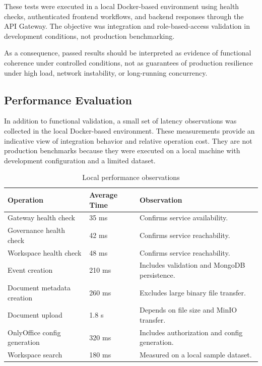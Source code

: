 These tests were executed in a local Docker-based environment using health
checks, authenticated frontend workflows, and backend responses through the API
Gateway. The objective was integration and role-based-access validation in
development conditions, not production benchmarking.

As a consequence, passed results should be interpreted as evidence of functional
coherence under controlled conditions, not as guarantees of production
resilience under high load, network instability, or long-running concurrency.

\subsection{Performance Evaluation}

In addition to functional validation, a small set of latency observations was
collected in the local Docker-based environment. These measurements provide an
indicative view of integration behavior and relative operation cost. They are
not production benchmarks because they were executed on a local machine with
development configuration and a limited dataset.

\begin{table}[!htbp]
\centering
\caption{Local performance observations}
\label{tab:local-performance-observations}
{
\scriptsize
\renewcommand{\arraystretch}{1.05}
\setlength{\tabcolsep}{3.4pt}
\begin{tabularx}{\textwidth}{|Y|C{1.8cm}|Y|}
\hline
\textbf{Operation} & \textbf{Average Time} & \textbf{Observation} \\
\hline
Gateway health check & 35 ms & Confirms service availability. \\
\hline
Governance health check & 42 ms & Confirms service reachability. \\
\hline
Workspace health check & 48 ms & Confirms service reachability. \\
\hline
Event creation & 210 ms & Includes validation and MongoDB persistence. \\
\hline
Document metadata creation & 260 ms & Excludes large binary file transfer. \\
\hline
Document upload & 1.8 s & Depends on file size and MinIO transfer. \\
\hline
OnlyOffice config generation & 320 ms & Includes authorization and config generation. \\
\hline
Workspace search & 180 ms & Measured on a local sample dataset. \\
\hline
\end{tabularx}
}
\end{table}

